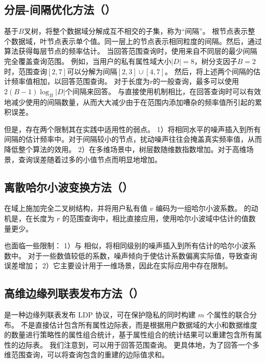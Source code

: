 \subsection{分层-间隔优化方法（\myhio）}
\label{exsitingHIO}
基于$B$叉树，\myhio \cite{wang2019answering}将整个数据域分解成互不相交的子集，称为“间隔”。
根节点表示整个数据域，叶节点表示单个值。同一层上的节点表示相同粒度的间隔。然后，\myhio 通过\oue \cite{wang2017locally}算法获得每层节点的频率估计。
当回答范围查询时，\myhio 使用来自不同层的最少间隔完全覆盖查询范围。
例如，当用户的私有属性域大小$|D|=8$，树分支因子$B=2$时，范围查询$[2,7]$可以分解为间隔$[2,3] \cup [4,7]$。
然后，\myhio 将上述两个间隔的估计频率值相加，以回答范围查询。
对于长度为$r$的一般查询，\myhio 最多可以使用$2(B-1)\log_B|D|$个间隔来回答。
与直接使用\fo 机制相比，\myhio 在回答查询时可以有效地减少使用的间隔数量，从而大大减少由于在范围内添加嘈杂的频率值所引起的累积误差。

但是，\myhio 存在两个限制其在实践中适用性的弱点。
1）\myhio 将相同水平的噪声插入到所有间隔的估计频率中。对于间隔较小的节点，扰动噪声往往会掩盖真实频率值，从而降低整个算法的效用。
2）在多维场景中，树层数随维数指数增加。对于高维场景，查询误差随着过多的小值节点而明显地增加。

\subsection{离散哈尔小波变换方法（\mydht）}
\label{exsitingDHT}
\mydht \cite{cormode2019answering} 在域上施加完全二叉树结构，并将用户私有值 $v$ 编码为一组哈尔小波系数。 
\mydht 的动机是，在长度为 $r$ 的范围查询中，相比直接应用\fo ，使用哈尔小波域中估计的值数量更少。

\mydht 也面临一些限制：
1）与 \myhio 相似，\mydht 将相同级别的噪声插入到所有估计的哈尔小波系数中。
对于一些数值较低的系数，噪声倾向于使估计系数偏离实际值，导致查询误差增加；
2）它主要设计用于一维场景，因此在实际应用中存在限制。


\subsection{高维边缘列联表发布方法（\mycalm）}
\label{Consistent Adaptive Local Marginal}
\mycalm \cite{zhang2018calm} 是一种边缘列联表发布 LDP 协议，可在保护隐私的同时构建 $m$ 个属性的联合分布。
\mycalm 不是直接估计包含所有属性边际表，而是根据用户数据域的大小和数据维度的数量进行策略性的属性组合统计，基于属性组合的统计结果可以重建包含所有属性的边际表。
我们注意到，\mycalm 可以用于回答范围查询。
更具体地，为了回答一个多维范围查询，\mycalm 可以将查询包含的重建的边际值求和。

